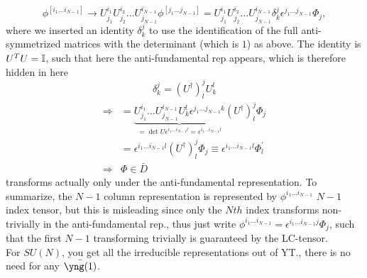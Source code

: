 \begin{enumerate}
\begin{equation}
\phi^{[i_1\dots i_{N-1}]} \rightarrow U^{i_1}_{j_1} U^{i_2}_{j_2} \dots U^{i_{N-1}}_{j_{N-1}} \phi^{[j_1 \dots j_{N-1}]} = U^{i_1}_{j_1} U^{i_2}_{j_2} \dots U^{i_{N-1}}_{j_{N-1}} \delta^j_k \epsilon^{j_1\dots j_{N-1}} \Phi_j,    
\end{equation}
where we inserted an identity $\delta^j_k$ to use the identification of the full anti-symmetrized matrices with the determinant (which is $1$) as above. The identity is $U^T U=\mathbb{I}$, such that here the anti-fundamental rep appears, which is therefore hidden in here
\begin{equation}
\delta^j_k = (U^\dagger)^j_l U^l_k
\end{equation}
\begin{align*}
	\Rightarrow &= \underbrace{U^{i_1}_{j_1} \dots U^{i_{N-1}}_{j_{N-1}} U^l_k \epsilon^{j_1 \dots j_{N-1} k} }_{=\det U \epsilon^{i_1 \dots i_{N-1} l} = \epsilon^{i_1 \dots i_{N-1} l}} (U^\dagger)^j_l \Phi_j\\
		&= \epsilon^{i_1 \dots i_{N-1}l} (U^\dagger)^j_l \Phi_j \equiv \epsilon^{i_1 \dots i_{N-1} l} \Phi^\prime_l\\
		\Rightarrow &\Phi \in \bar{D}
	\end{align*}
	transforms actually only under the anti-fundamental representation. To summarize, the $N-1$ column representation is represented by $\phi^{i_1 \dots i_{N-1}}$ $N-1$ index tensor, but this is misleading since only the $Nth$ index transforms non-trivially in the anti-fundamental rep., thus just write $\phi^{i_1 \dots i_{N-1}}=\epsilon^{i_1 \dots i_{N-1} j} \Phi_j$, such that the first $N-1$ transforming trivially is guaranteed by the LC-tensor.\\
	For $SU(N)$, you get all the irreducible representations out of YT., there is no need for any $\bar{\yng(1)}$.
\end{enumerate}
